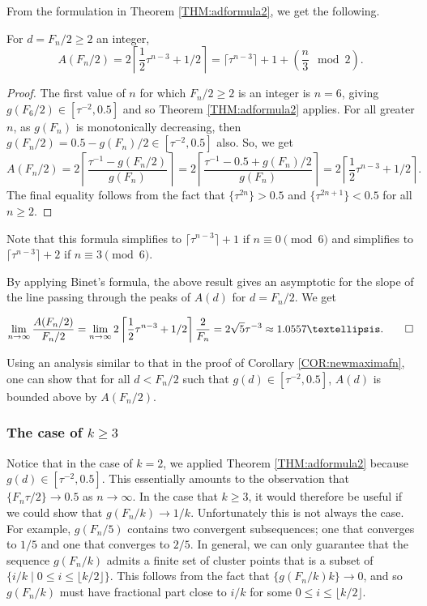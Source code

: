 \documentclass[10pt,a4paper,reqno]{amsart}
\begin{document}
From the formulation in Theorem \ref{THM:adformula2}, we get the following.
\begin{cor}\label{COR:A(fn/2)}
    For $d=F_n/2 \geq 2$ an integer, 
    \[A(F_n/2)=2\left\lceil\frac{1}{2}\tau^{n-3}+1/2\right\rceil = \lceil \tau^{n-3}\rceil + 1 +\left(\frac{n}{3}\mod 2\right).\]
\end{cor}
\begin{proof}
The first value of $n$ for which $F_n/2 \geq 2$ is an integer is $n=6$, giving $g(F_6/2) \in [\tau^{-2},0.5]$ and so Theorem \ref{THM:adformula2} applies. For all greater $n$, as $g(F_n)$ is monotonically decreasing, then $g(F_n/2) = 0.5 - g(F_n)/2 \in [\tau^{-2},0.5]$ also. So, we get
\[A(F_n/2)=2\left\lceil\frac{\tau^{-1}-g(F_n/2)}{g(F_n)}\right\rceil =2\left\lceil\frac{\tau^{-1}-0.5+g(F_n)/2}{g(F_n)}\right\rceil =2\left\lceil\frac{1}{2}\tau^{n-3}+1/2\right\rceil.\]
The final equality follows from the fact that $\{\tau^{2n}\}>0.5$ and $\{\tau^{2n+1}\}<0.5$ for all $n \geq 2$.
\end{proof}
Note that this formula simplifies to $\lceil \tau^{n-3}\rceil +1 $ if $n \equiv 0\pmod 6$ and simplifies to $\lceil \tau^{n-3}\rceil +2 $ if $n \equiv 3\pmod 6$.

By applying Binet's formula, the above result gives an asymptotic for the slope of the line passing through the peaks of $A(d)$ for $d = F_n/2$. We get
\begin{cor}\label{COR:Afn/2bound}
\[\lim_{n\to\infty}\frac{A(F_n/2)}{F_n/2}= \lim_{n\to\infty} 2\left\lceil\frac{1}{2}\tau^{n-3}+1/2\right\rceil\frac{2}{F_n} = 2\sqrt{5}\tau^{-3}\approx 1.0557\ldots .\qed\]
\end{cor}
Using an analysis similar to that in the proof of Corollary \ref{COR:newmaximafn}, one can show that for all $d<F_n/2$ such that $g(d) \in [\tau^{-2},0.5]$, $A(d)$ is bounded above by $A(F_n/2)$.
\subsubsection{The case of $k \geq 3$}
Notice that in the case of $k=2$, we applied Theorem \ref{THM:adformula2} because $g(d) \in [\tau^{-2},0.5]$. This essentially amounts to the observation that $\{F_n\tau/2\} \to 0.5$ as $n \to \infty$. In the case that $k \geq 3$, it would therefore be useful if we could show that $g(F_n/k)\to 1/k$. Unfortunately this is not always the case. For example, $g(F_n/5)$ contains two convergent subsequences; one that converges to $1/5$ and one that converges to $2/5$. In general, we can only guarantee that the sequence $g(F_n/k)$ admits a finite set of cluster points that is a subset of $\{i/k \mid 0 \leq i \leq \lfloor k/2\rfloor\}$. This follows from the fact that $\{g(F_n/k)k\}\to 0$, and so $g(F_n/k)$ must have fractional part close to $i/k$ for some $0 \leq i \leq \lfloor k/2\rfloor$.
\end{document}
